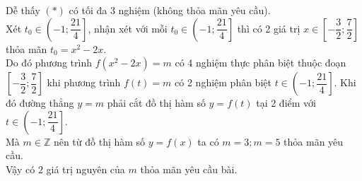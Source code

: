 \begin{ex}
{		Dễ thấy $(*)$ có tối đa 3 nghiệm (không thỏa mãn yêu cầu).\\
		Xét $t_0 \in \left( -1;\dfrac{21}{4}\right]$, nhận xét với mỗi $t_0 \in \left( -1;\dfrac{21}{4} \right]$ thì có 2 giá trị $ x\in \left[ -\dfrac{3}{2};\dfrac{7}{2}\right]$ thỏa mãn $t_0 = x^2 -2x$.\\
		Do đó phương trình $ f\left(x^2 -2x\right)=m$ có 4 nghiệm thực phân biệt thuộc đoạn $\left[ -\dfrac{3}{2};\dfrac{7}{2} \right]$ khi phương trình $ f(t)=m$ có 2 nghiệm phân biệt $ t\in \left( -1;\dfrac{21}{4}\right]$. Khi đó đường thẳng $ y=m$ phải cắt đồ thị hàm số $ y=f(t)$ tại 2 điểm với $ t\in \left( -1;\dfrac{21}{4}\right]$.\\
		Mà $ m\in \mathbb{Z}$ nên từ đồ thị hàm số $ y=f(x)$ ta có $ m=3;m=5$ thỏa mãn yêu cầu.\\
		Vậy có $2$ giá trị nguyên của $ m$ thỏa mãn yêu cầu bài.
	}
\end{ex}
